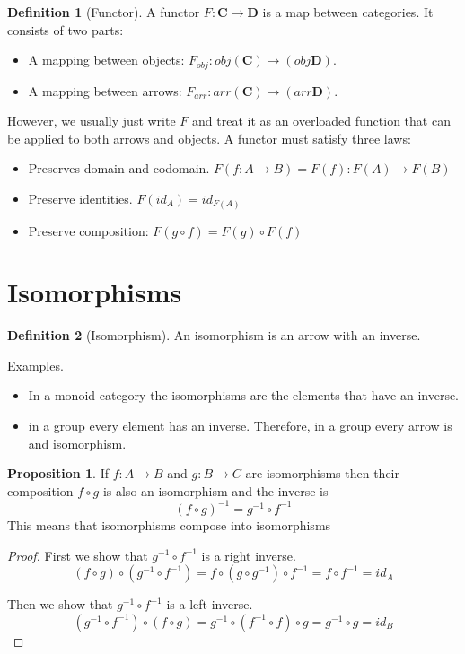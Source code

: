 \documentclass{book}
\theoremstyle{definition}
\newtheorem{definition}{Definition}[section]
\newtheorem{proposition}{Proposition}
\newcommand{\arr}[3]{#1 : #2 \rightarrow #3}
\newcommand\id{\mathit{id}}
\begin{document}
\begin{definition}[Functor]
  A functor $\arr{F}{\mathbf{C}}{\mathbf{D}}$ is a map between categories. It
  consists of two parts:
  \begin{itemize}
  \item A mapping between objects:
    $\arr{F_{obj}}{obj(\mathbf{C})}{(obj\mathbf{D})}$.
  \item A mapping between arrows:
    $\arr{F_{arr}}{arr(\mathbf{C})}{(arr\mathbf{D})}$.
  \end{itemize}
  However, we usually just write $F$ and treat it as an overloaded function that
  can be applied to both arrows and objects. A functor must satisfy three laws:
  \begin{itemize}
  \item Preserves domain and codomain. $F(\arr{f}{A}{B}) =
    \arr{F(f)}{F(A)}{F(B)}$
    \item Preserve identities. $F(\id_A) = \id_{F(A)}$
    \item Preserve composition: $F(g \circ f) = F(g) \circ F(f)$
  \end{itemize}
\end{definition}

\section{Isomorphisms}

\begin{definition}[Isomorphism]
  An isomorphism is an arrow with an inverse.
\end{definition}

Examples.
\begin{itemize}
  \item In a monoid category the isomorphisms are the elements that have an inverse.
  \item in a group every element has an inverse. Therefore, in a group every
    arrow is and isomorphism.
\end{itemize}

\begin{proposition}
  If $\arr{f}{A}{B}$ and $\arr{g}{B}{C}$ are isomorphisms then their composition
  $f \circ g$ is also an isomorphism and the inverse is
  \[ (f \circ g)^{-1} = g^{-1} \circ f^{-1} \]
  This means that isomorphisms compose into isomorphisms
\end{proposition}
\begin{proof}
  First we show that $g^{-1} \circ f^{-1}$ is a right inverse.
  \[ (f \circ g) \circ (g^{-1} \circ f^{-1}) = f \circ (g \circ g^{-1}) \circ
    f^{-1} = f \circ f^{-1} = id_A \]

  Then we show that $g^{-1} \circ f^{-1}$ is a left inverse.
  \[ (g^{-1} \circ f^{-1}) \circ (f \circ g) = g^{-1} \circ (f^{-1} \circ f)
    \circ g = g^{-1} \circ g = id_B\]
\end{proof}
\end{document}
